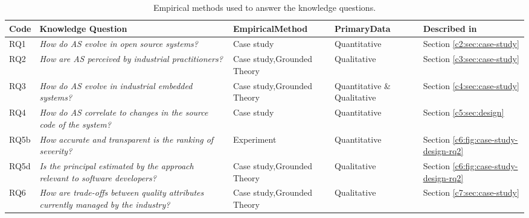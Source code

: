 \begin{table}[]
    \footnotesize
    \centering
    \caption{Empirical methods used to answer the knowledge questions.}
    \label{c1:tab:overview-methodology}
    \begin{tabular}{@{}lm{3.75cm}m{2.75cm}m{2cm}l@{}}
    \toprule
    \textbf{Code} & \textbf{Knowledge Question} & \textbf{Empirical}\newline \textbf{Method} & \textbf{Primary}\newline \textbf{Data} & \textbf{Described in} \\ \midrule
    RQ1 & \textit{How do AS evolve in open source systems?} & Case study & Quantitative & Section \ref{c2:sec:case-study} \\
    RQ2 & \textit{How are AS perceived by industrial practitioners?} & Case study,\newline Grounded Theory & Qualitative & Section \ref{c3:sec:case-study}  \\
    RQ3 & \textit{How do AS evolve in industrial embedded systems?} & Case study,\newline Grounded Theory & Quantitative \& Qualitative & Section \ref{c4:sec:case-study} \\
    RQ4 & \textit{How do AS correlate to changes in the source code of the system?} & Case study & Quantitative  & Section \ref{c5:sec:design} \\
    RQ5b & \textit{How accurate and transparent is the ranking of severity?} & Experiment & Quantitative & Section \ref{c6:fig:case-study-design-rq2}  \\ 
    RQ5d & \textit{Is the principal estimated by the approach relevant to software developers?} & Case study,\newline Grounded Theory & Qualitative & Section \ref{c6:fig:case-study-design-rq2}  \\ 
    RQ6 & \textit{How are trade-offs between quality attributes currently managed by the industry?} & Case study,\newline Grounded Theory & Qualitative & Section \ref{c7:sec:case-study} \\ \bottomrule
    \end{tabular}
\end{table}

